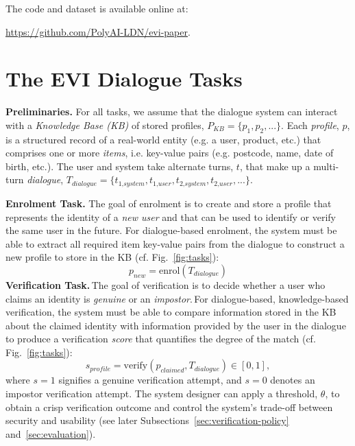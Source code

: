 \documentclass[11pt]{article}
\newcommand{\sparagraph}[1]{\noindent\textbf{#1.}}
\newcommand{\rparagraph}[1]{\vspace{1.4mm}\noindent\textbf{#1.}}
\begin{document}
The code and dataset is available online at: {\url{https://github.com/PolyAI-LDN/evi-paper}.
 
\section{The EVI Dialogue Tasks}
\label{sec:tasks}





\sparagraph{Preliminaries}
For all tasks,
we assume that the dialogue system can interact with a \textit{Knowledge Base (KB)} of stored profiles, $P_\textit{KB}=\{p_1, p_2, ...\}$.
Each \textit{profile}, $p$, is a structured record
of a real-world entity (e.g. a user, product, etc.)
that comprises one or more \textit{items},
i.e. key-value pairs
(e.g. postcode, name, date of birth, etc.).
The user and system take alternate turns, $t$, that make up a multi-turn \textit{dialogue},
$T_\textit{dialogue}=\{t_\textit{1,system},t_\textit{1,user},t_\textit{2,system},t_\textit{2,user},...\}$.

\rparagraph{Enrolment Task}
The goal of enrolment is to
create and store a profile
that represents the identity of a \textit{new user}
and that can be used to identify or verify the same user
in the future.
For dialogue-based enrolment,
the system must be able to
extract all required item key-value pairs from the dialogue
to construct a new profile to store in the KB (cf. Fig.~\ref{fig:tasks}):
\begin{equation}
p_\textit{new}={\textrm{enrol}}(T_\textit{dialogue})
\end{equation}
\sparagraph{Verification Task}\,The goal of verification is to
decide whether a user who claims an identity
is \textit{genuine} or an \textit{impostor}.\,For dialogue-based, knowledge-based verification,
the system must be able to
compare information stored in the KB about the claimed identity
with information provided by the user in the dialogue
to produce a verification \textit{score}
that quantifies the degree of the match
(cf. \!Fig.~\!\ref{fig:tasks}):
\begin{equation}
s_\textit{profile} = {\textrm{verify}}(p_\textit{claimed}, T_{dialogue}) 
\in [0,1],
\label{eq:verify-profile}
\end{equation}
where $s=1$ signifies a genuine verification attempt,
and $s=0$ denotes an impostor verification attempt.
The system designer can apply a threshold, $\theta$,
to obtain a crisp verification outcome
and control the system's trade-off between security and usability (see later Subsections~\ref{sec:verification-policy} and~\ref{sec:evaluation}).



}
\end{document}

